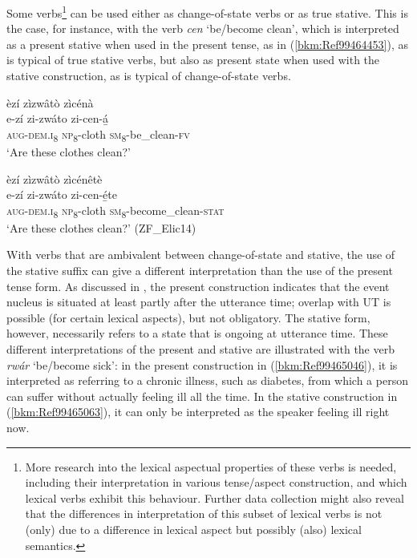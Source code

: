 Some verbs\footnote{More research into the lexical aspectual properties of these verbs is needed, including their interpretation in various tense/aspect construction, and which lexical verbs exhibit this behaviour. Further data collection might also reveal that the differences in interpretation of this subset of lexical verbs is not (only) due to a difference in lexical aspect but possibly (also) lexical semantics.} can be used either as change-of-state verbs or as true stative. This is the case, for instance, with the verb \textit{cen} ‘be/become clean’, which is interpreted as a present stative when used in the present tense, as in (\ref{bkm:Ref99464453}), as is typical of true stative verbs, but also as present state when used with the stative construction, as is typical of change-of-state verbs.

\ea
\label{bkm:Ref99464453}
èzí zìzwâtò zìcénà\\
\gll e-zí    zi-zwáto  zi-cen-á̲\\
\textsc{aug}-\textsc{dem}.\textsc{i}\textsubscript{8}  \textsc{np}\textsubscript{8}-cloth  \textsc{sm}\textsubscript{8}-be\_clean-\textsc{fv}\\
\glt ‘Are these clothes clean?’
\z

\ea
èzí zìzwâtò zìcénêtè\\
\gll e-zí    zi-zwáto  zi-cen-é̲te\\
\textsc{aug}-\textsc{dem}.\textsc{i}\textsubscript{8}  \textsc{np}\textsubscript{8}-cloth  \textsc{sm}\textsubscript{8}-become\_clean-\textsc{stat}\\
\glt ‘Are these clothes clean?’ (ZF\_Elic14)
\z

With verbs that are ambivalent between change-of-state and stative, the use of the stative suffix can give a different interpretation than the use of the present tense form. As discussed in , the present construction indicates that the event nucleus is situated at least partly after the utterance time; overlap with UT is possible (for certain lexical aspects), but not obligatory. The stative form, however, necessarily refers to a state that is ongoing at utterance time. These different interpretations of the present and stative are illustrated with the verb \textit{rwár} ‘be/become sick’: in the present construction in (\ref{bkm:Ref99465046}), it is interpreted as referring to a chronic illness, such as diabetes, from which a person can suffer without actually feeling ill all the time. In the stative construction in (\ref{bkm:Ref99465063}), it can only be interpreted as the speaker feeling ill right now.

